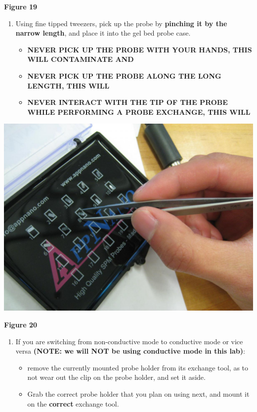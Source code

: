\documentclass{../lab}
\begin{document}
\textbf{Figure 19}

\begin{enumerate}
    \item Using fine tipped tweezers, pick up the probe by \textbf{pinching it by the narrow length}, and place it into the gel bed probe case.
    \begin{itemize}
        \item \textbf{NEVER PICK UP THE PROBE WITH YOUR HANDS, THIS WILL CONTAMINATE AND }

        \item \textbf{NEVER PICK UP THE PROBE ALONG THE LONG LENGTH, THIS WILL }

        \item \textbf{NEVER INTERACT WITH THE TIP OF THE PROBE WHILE PERFORMING A PROBE EXCHANGE, THIS WILL }

    \end{itemize}

\end{enumerate}


\begin{center}
    \href{http://experimentationlab.berkeley.edu/sites/default/files/AFMImages/20.JPG}{\includegraphics[width=0.5\linewidth]{images/20.JPG}}
\end{center}

\textbf{Figure 20}

\begin{enumerate}
    \item If you are switching from non-conductive mode to conductive mode or vice versa\textbf{ (NOTE:  we will NOT be using conductive mode in this lab)}:
    \begin{itemize}
        \item remove the currently mounted probe holder from its exchange tool, as to not wear out the clip on the probe holder, and set it aside.

        \item Grab the correct probe holder that you plan on using next, and mount it on the \textbf{correct} exchange tool.

    \end{itemize}

\end{enumerate}
\end{document}
